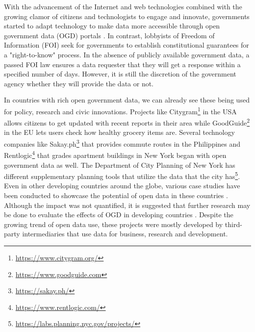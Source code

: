\documentclass{sigchi}
\begin{document}
With the advancement of the Internet and web technologies combined with the growing clamor of citizens and technologists to engage and innovate, governments started to adapt technology to make data more accessible through open government data (OGD) portals \cite{DAWES201615, YuRobinson2012}. In contrast, lobbyists of Freedom of Information (FOI) seek for governments to establish constitutional guarantees for a "right-to-know" process. In the absence of publicly available government data, a passed FOI law ensures a data requester that they will get a response within a specified number of days. However, it is still the discretion of the government agency whether they will provide the data or not. 

In countries with rich open government data, we can already see these being used for policy, research and civic innovations. Projects like Citygram\footnote{\url{https://www.citygram.org/}} in the USA allows citizens to get updated with recent reports in their area while GoodGuide\footnote{\url{https://www.goodguide.com}} in the EU lets users check how healthy grocery items are. Several technology companies like Sakay.ph\footnote{\url{https://sakay.ph/}} that provides commute routes in the Philippines and Rentlogic\footnote{\url{https://www.rentlogic.com/}} that grades apartment buildings in New York began with open government data as well. The Department of City Planning of New York has different supplementary planning tools that utilize the data that the city has\footnote{\url{https://labs.planning.nyc.gov/projects/}}. Even in other developing countries around the globe, various case studies have been conducted to showcase the potential of open data in these countries \cite{farahi2018}. Although the impact was not quantified, it is suggested that further research may be done to evaluate the effects of OGD in developing countries \cite{farahi2018}. Despite the growing trend of open data use, these projects were mostly developed by third-party intermediaries that use data for business, research and development. 
\end{document}

